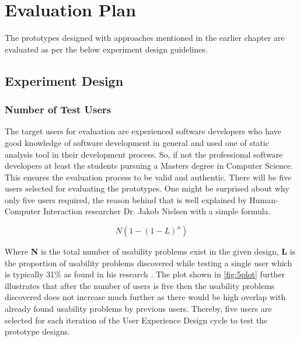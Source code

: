 \chapter{Evaluation Plan}
\label{ch:evaluationplan} 

The prototypes designed with approaches mentioned in the earlier chapter are evaluated as per the below experiment design guidelines. \\

\section{Experiment Design}

\subsection{Number of Test Users}

The target users for evaluation are experienced software developers who have good knowledge of software development in general and used one of static analysis tool in their development process. So, if not the professional software developers at least the students pursuing a Masters degree in Computer Science. This ensures the evaluation process to be valid and authentic. There will be five users selected for evaluating the prototypes. One might be surprised about why only five users required, the reason behind that is well explained by Human-Computer Interaction researcher Dr. Jakob Nielsen with a simple formula\cite{five}.

\[ N (1-(1- L )^n ) \]

Where \textbf{N} is the total number of usability problems exist in the given design, \textbf{L} is the proportion of usability problems discovered while testing a single user which is typically 31\% as found in his research \cite{5users}. The plot shown in \autoref{fig:5plot} further illustrates that after the number of users is five then the usability problems discovered does not increase much further as there would be high overlap with already found usability problems by previous users. Thereby, five users are selected for each iteration of the User Experience Design cycle to test the prototype designs. \\ \\

